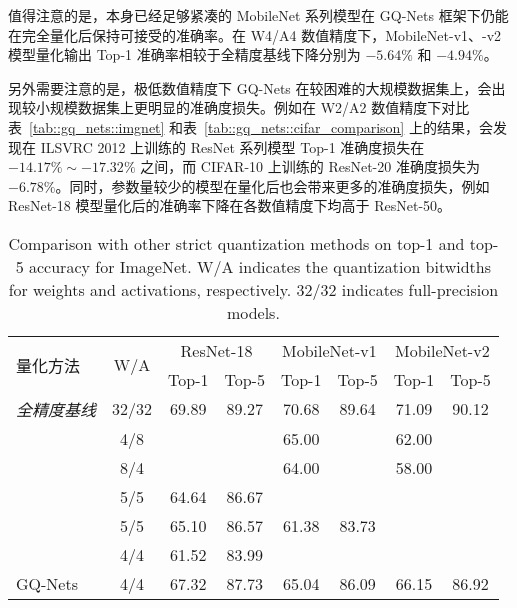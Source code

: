 值得注意的是，本身已经足够紧凑的 MobileNet 系列模型在 GQ-Nets 框架下仍能在完全量化后保持可接受的准确率。在 W4/A4 数值精度下，MobileNet-v1、-v2 模型量化输出 Top-1 准确率相较于全精度基线下降分别为 $-5.64\%$ 和 $-4.94\%$。

另外需要注意的是，极低数值精度下 GQ-Nets 在较困难的大规模数据集上，会出现较小规模数据集上更明显的准确度损失。例如在 W2/A2 数值精度下对比表~\ref{tab::gq_nets::imgnet} 和表~\ref{tab::gq_nets::cifar_comparison} 上的结果，会发现在 ILSVRC 2012 上训练的 ResNet 系列模型 Top-1 准确度损失在 $-14.17\% \sim -17.32\%$ 之间，而 CIFAR-10 上训练的 ResNet-20 准确度损失为 $-6.78\%$。同时，参数量较少的模型在量化后也会带来更多的准确度损失，例如 ResNet-18 模型量化后的准确率下降在各数值精度下均高于 ResNet-50。

\begin{table}[htb]
  \caption{Comparison with other strict quantization methods on top-1 and top-5 accuracy for ImageNet. W/A indicates the quantization bitwidths for weights and activations, respectively. 32/32 indicates full-precision models.}
  \label{tab::gq_nets::imgnet_comparison}
  \begin{center}
    \begin{tabular}{l *{7}{c}}
      \toprule
      \multirow{2}{*}{量化方法} & \multirow{2}{*}{W/A} & \multicolumn{2}{c}{ResNet-18} & \multicolumn{2}{c}{MobileNet-v1} & \multicolumn{2}{c}{MobileNet-v2} \\
      & & Top-1 & Top-5 & Top-1 & Top-5 & Top-1 & Top-5 \\
      \midrule
      \emph{全精度基线} & 32/32 & 69.89 & 89.27 & 70.68 & 89.64 & 71.09 & 90.12 \\
      \hdashline
      \multirow{2}{*}{\citet{krishnamoorthi2018quantizing}} & 4/8 & & & 65.00 & & 62.00 & \\
        & 8/4 & & & 64.00 & & 58.00 & \\
      \hdashline
      \citet{jacob2018quantization} & 5/5 & 64.64 & 86.67 & & & & \\
      \hdashline
      \multirow{2}{*}{\citet{louizos2018relaxed}} & 5/5 & 65.10 & 86.57 & 61.38 & 83.73 & & \\
        & 4/4 & 61.52 & 83.99 & & & & \\
      \hdashline
        GQ-Nets & 4/4 & 67.32 & 87.73 & 65.04 & 86.09 & 66.15 & 86.92 \\
      \bottomrule
    \end{tabular}
  \end{center}
\end{table}


